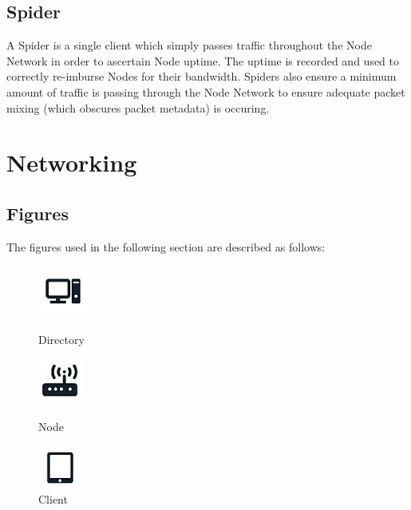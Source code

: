 \documentclass{article}
\begin{document}
\subsection{Spider}
A Spider is a single client which simply passes traffic throughout the Node Network in order to ascertain Node uptime. The uptime is recorded and used to correctly re-imburse
Nodes for their bandwidth. Spiders also ensure a minimum amount of traffic is passing through the Node Network to ensure adequate packet mixing (which obscures packet metadata)
is occuring.

\newpage

\section{Networking}
\subsection{Figures}
The figures used in the following section are described as follows:

\begin{figure}[h]
\centering
\begin{minipage}{.3\textwidth}
  	\centering
  	\includegraphics[width=1.7cm,height=1.7cm,keepaspectratio]{img/Directory.png}
	\caption{Directory}
\end{minipage}
\begin{minipage}{.3\textwidth}
  	\centering
	\includegraphics[width=1.5cm,height=1.5cm,keepaspectratio]{img/Node.png}
	\caption{Node}
\end{minipage}
\begin{minipage}{.3\textwidth}
  	\centering
	\includegraphics[width=1.4cm,height=1.4cm,keepaspectratio]{img/Client.png}
	\caption{Client}
\end{minipage}
\end{figure}
\end{document}
